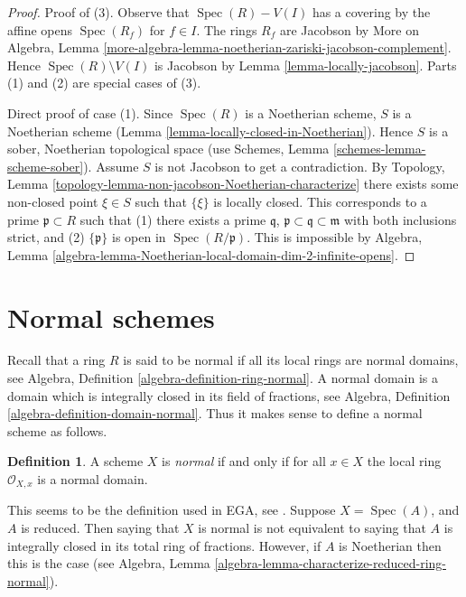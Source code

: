 \documentclass{stacks-project}
\theoremstyle{plain}
\theoremstyle{definition}
\newtheorem{definition}[subsection]{Definition}
\theoremstyle{remark}
\numberwithin{equation}{subsection}
\def\Spec{\mathop{\mathrm{Spec}}}
\begin{document}
\begin{proof}
Proof of (3). Observe that $\Spec(R) - V(I)$ has a covering by the affine
opens $\Spec(R_f)$ for $f \in I$. The rings $R_f$ are Jacobson by
More on Algebra, Lemma
\ref{more-algebra-lemma-noetherian-zariski-jacobson-complement}.
Hence $\Spec(R) \setminus V(I)$ is Jacobson by
Lemma \ref{lemma-locally-jacobson}.
Parts (1) and (2) are special cases of (3).

\medskip\noindent
Direct proof of case (1).
Since $\Spec(R)$ is a Noetherian scheme,
$S$ is a Noetherian scheme (Lemma \ref{lemma-locally-closed-in-Noetherian}).
Hence $S$ is a sober, Noetherian topological space (use
Schemes, Lemma \ref{schemes-lemma-scheme-sober}).
Assume $S$ is not Jacobson to
get a contradiction. By
Topology, Lemma \ref{topology-lemma-non-jacobson-Noetherian-characterize}
there exists some non-closed point $\xi \in S$
such that $\{\xi\}$ is locally closed. This corresponds
to a prime $\mathfrak p \subset R$ such that (1) there exists
a prime $\mathfrak q$, $\mathfrak p \subset \mathfrak q \subset \mathfrak m$
with both inclusions strict, and (2) $\{\mathfrak p\}$ is open in
$\Spec(R/\mathfrak p)$. This is impossible by Algebra,
Lemma \ref{algebra-lemma-Noetherian-local-domain-dim-2-infinite-opens}.
\end{proof}







\section{Normal schemes}
\label{section-normal}

\noindent
Recall that a ring $R$ is said to be normal if all its local rings
are normal domains,
see Algebra, Definition \ref{algebra-definition-ring-normal}.
A normal domain is a domain which is integrally closed in its field
of fractions, see
Algebra, Definition \ref{algebra-definition-domain-normal}.
Thus it makes sense to define a normal scheme as follows.

\begin{definition}
\label{definition-normal}
A scheme $X$ is {\it normal} if and only if for all $x \in X$ the local ring
$\mathcal{O}_{X, x}$ is a normal domain.
\end{definition}

\noindent
This seems to be the definition used in EGA, see \cite[0, 4.1.4]{EGA}.
Suppose $X = \Spec(A)$, and $A$ is reduced. Then saying that $X$ is
normal is not equivalent to saying that $A$ is integrally closed in its
total ring of fractions. However, if $A$ is Noetherian then this is the case
(see Algebra, Lemma \ref{algebra-lemma-characterize-reduced-ring-normal}).
\end{document}
